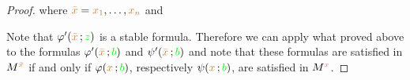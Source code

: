 \begin{proof}

  where ${\color{brown}\bar x}={\color{brown} x_1},\dots,{\color{brown} x_n}$ and 



  Note that $\varphi'({\color{brown}\bar x}\,;{\color{green} z})$ is a stable formula.
  Therefore we can apply what proved above to the formulas $\varphi'({\color{brown}\bar x}\,;{\color{green} b})$ and $\psi'({\color{brown}\bar x}\,;{\color{green} b})$ and note that these formulas are satisfied in $M^{\color{brown}\bar x}$ if and only if $\varphi({\color{brown} x}\,;{\color{green} b})$, respectively $\psi({\color{brown} x}\,;{\color{green} b})$, are satisfied in $M^{\color{brown} x}$.
\end{proof}






